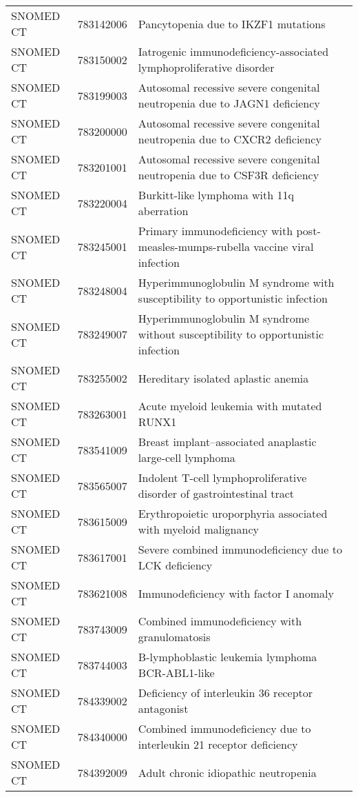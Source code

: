 \begin{table}[ht]
\begin{tabular}{lll}
  SNOMED CT & 783142006 & Pancytopenia due to IKZF1 mutations \\ 
  SNOMED CT & 783150002 & Iatrogenic immunodeficiency-associated lymphoproliferative disorder \\ 
  SNOMED CT & 783199003 & Autosomal recessive severe congenital neutropenia due to JAGN1 deficiency \\ 
  SNOMED CT & 783200000 & Autosomal recessive severe congenital neutropenia due to CXCR2 deficiency \\ 
  SNOMED CT & 783201001 & Autosomal recessive severe congenital neutropenia due to CSF3R deficiency \\ 
  SNOMED CT & 783220004 & Burkitt-like lymphoma with 11q aberration \\ 
  SNOMED CT & 783245001 & Primary immunodeficiency with post-measles-mumps-rubella vaccine viral infection \\ 
  SNOMED CT & 783248004 & Hyperimmunoglobulin M syndrome with susceptibility to opportunistic infection \\ 
  SNOMED CT & 783249007 & Hyperimmunoglobulin M syndrome without susceptibility to opportunistic infection \\ 
  SNOMED CT & 783255002 & Hereditary isolated aplastic anemia \\ 
  SNOMED CT & 783263001 & Acute myeloid leukemia with mutated RUNX1 \\ 
  SNOMED CT & 783541009 & Breast implant–associated anaplastic large-cell lymphoma \\ 
  SNOMED CT & 783565007 & Indolent T-cell lymphoproliferative disorder of gastrointestinal tract \\ 
  SNOMED CT & 783615009 & Erythropoietic uroporphyria associated with myeloid malignancy \\ 
  SNOMED CT & 783617001 & Severe combined immunodeficiency due to LCK deficiency \\ 
  SNOMED CT & 783621008 & Immunodeficiency with factor I anomaly \\ 
  SNOMED CT & 783743009 & Combined immunodeficiency with granulomatosis \\ 
  SNOMED CT & 783744003 & B-lymphoblastic leukemia lymphoma BCR-ABL1-like \\ 
  SNOMED CT & 784339002 & Deficiency of interleukin 36 receptor antagonist \\ 
  SNOMED CT & 784340000 & Combined immunodeficiency due to interleukin 21 receptor deficiency \\ 
  SNOMED CT & 784392009 & Adult chronic idiopathic neutropenia \\ 

\end{tabular}
\end{table}
